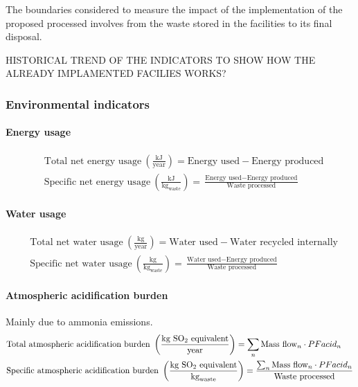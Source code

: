 \documentclass[10pt,a4paper]{article}
\begin{document}
The boundaries considered to measure the impact of the implementation of the proposed processed involves from the waste stored in the facilities to its final disposal.


HISTORICAL TREND OF THE INDICATORS TO SHOW HOW THE ALREADY IMPLAMENTED FACILIES WORKS?

\subsubsection{Environmental indicators}
\paragraph{Energy usage}
\begin{align} 
& \text{Total net energy usage} \ \left(\frac{\text{kJ}}{\text{year}}\right) = \text{Energy used} - \text{Energy produced} \\
& \text{Specific net energy usage} \ \left(\frac{\text{kJ}}{\text{kg}_{\text{waste}}}\right) = \frac{\text{Energy used} - \text{Energy produced}}{\text{Waste processed}}
\end{align}

\paragraph{Water usage}
\begin{align} 
& \text{Total net water usage} \ \left(\frac{\text{kg}}{\text{year}}\right) = \text{Water used} - \text{Water recycled internally} \\
& \text{Specific net water usage} \ \left(\frac{\text{kg}}{\text{kg}_{\text{waste}}}\right) = \frac{\text{Water used} - \text{Energy produced}}{\text{Waste processed}}
\end{align}

\paragraph{Atmospheric acidification burden}
Mainly due to ammonia emissions.
\begin{align} 
& \text{Total atmospheric acidification burden} \ \left(\frac{\text{kg SO\textsubscript{2} equivalent}}{\text{year}}\right) = \sum_{n} \text{Mass flow}_{n} \cdot PFacid_{n} \\
& \text{Specific atmospheric acidification burden} \ \left(\frac{\text{kg SO\textsubscript{2} equivalent}}{\text{kg}_{\text{waste}}}\right) = \frac{\sum_{n} \text{Mass flow}_{n} \cdot PFacid_{n}}{\text{Waste processed}}
\end{align}
\end{document}
